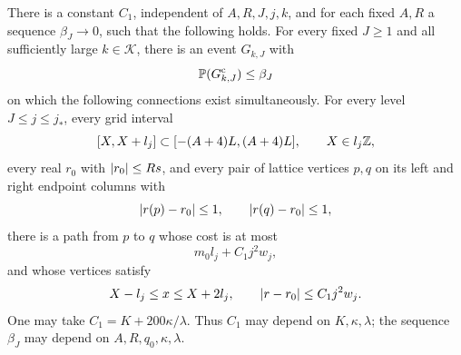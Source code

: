 \begin{lemma}\label{df:gr:grid-tools}
There is a constant $C_1$, independent of $A,R,J,j,k$, and for each
fixed $A,R$ a sequence $\beta_J\to0$, such that the following holds.
For every fixed $J\ge1$ and all sufficiently large $k\in\mathcal K$,
there is an event $G_{k,J}$ with
\[
 \mathbb P(G_{k,J}^{\mathrm c})\le\beta_J
\]
on which the following connections exist simultaneously. For every
level $J\le j\le j_*$, every grid interval
\[
 [X,X+l_j]\subset[-(A+4)L,(A+4)L],\qquad X\in l_j\mathbb Z,
\]
every real $r_0$ with $\left\lvert r_0\right\rvert\le Rs$, and every pair of lattice
vertices $p,q$ on its left and right endpoint columns with
\[
 \left\lvert r(p)-r_0\right\rvert\le1,\qquad\left\lvert r(q)-r_0\right\rvert\le1,
\]
there is a path from $p$ to $q$ whose cost is at most
\begin{equation}\label{df:eq:gr-grid-cost}
 m_0l_j+C_1j^2w_j,
\end{equation}
and whose vertices satisfy
\begin{equation}\label{df:eq:gr-grid-localization}
 X-l_j\le x\le X+2l_j,\qquad
 \left\lvert r-r_0\right\rvert\le C_1j^2w_j.
\end{equation}
One may take $C_1=K+200\kappa/\lambda$. Thus $C_1$ may depend on
$K,\kappa,\lambda$; the sequence $\beta_J$ may depend on
$A,R,q_0,\kappa,\lambda$.
\end{lemma}
